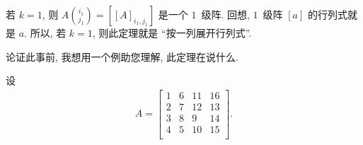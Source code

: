 若 \(k = 1\), 则
\(\displaystyle
A\binom{i_1}{j_1} = [[A]_{i_1,j_1}]\)
是一个 \(1\)~级阵.
回想, \(1\)~级阵 \([a]\) 的行列式就是 \(a\).
所以, 若 \(k = 1\), 则此定理就是
``按一列展开行列式''.

论证此事前, 我想用一个例助您理解, 此定理在说什么.

\begin{example}
    设
    \begin{align*}
        A =
        \begin{bmatrix}
            1 & 6 & 11 & 16 \\
            2 & 7 & 12 & 13 \\
            3 & 8 & 9  & 14 \\
            4 & 5 & 10 & 15 \\
        \end{bmatrix}.
    \end{align*}


\end{example}
